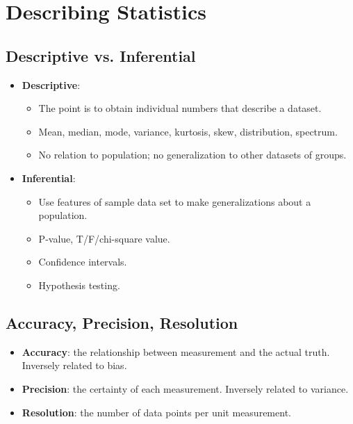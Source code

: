 \documentclass[12pt,a4paper]{article}
\begin{document}

\clearpage
\section{Describing Statistics}
\subsection{Descriptive vs. Inferential}
\begin{itemize}
    \item \textbf{Descriptive}:
        \begin{itemize}
            \item The point is to obtain individual numbers that describe a dataset.
            \item Mean, median, mode, variance, kurtosis, skew, distribution, spectrum.
            \item No relation to population; no generalization to other datasets of groups.
        \end{itemize}
    \item \textbf{Inferential}: 
        \begin{itemize}
            \item Use features of sample data set to make generalizations about a population.
            \item P-value, T/F/chi-square value.
            \item Confidence intervals.
            \item Hypothesis testing.
        \end{itemize}
\end{itemize}

\subsection{Accuracy, Precision, Resolution}
\begin{itemize}
    \item \textbf{Accuracy}: the relationship between measurement and the actual truth. Inversely related to {\color{o-Sun}bias}.
    \item \textbf{Precision}: the certainty of each measurement. Inversely related to {\color{o-Sun}variance}.
    \item \textbf{Resolution}: the number of data points per unit measurement.
\end{itemize}
\end{document}
